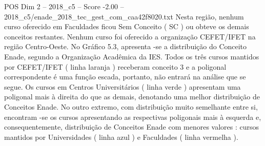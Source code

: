 \begin{textsample}{POS Dim 2 – 2018\_c5 – Score -2.00 – 2018\_c5/enade\_2018\_tec\_gest\_com\_caa42f8020.txt}
Nesta região, nenhum curso oferecido em Faculdades ficou Sem Conceito ( SC ) ou obteve os demais conceitos restantes.
Nenhum curso foi oferecido a organização CEFET/IFET na região Centro-Oeste.
No Gráfico 5.3, apresenta -se a distribuição do Conceito Enade, segundo a Organização Acadêmica da IES.
Todos os três cursos mantidos por CEFET/IFET ( linha laranja ) receberam conceito 3 e a poligonal correspondente é uma função escada, portanto, não entrará na análise que se segue.
Os cursos em Centros Universitários ( linha verde ) apresentam uma poligonal mais à direita do que as demais, denotando uma melhor distribuição de Conceitos Enade.
No outro extremo, com distribuição muito semelhante entre si, encontram -se os cursos apresentando as respectivas poligonais mais à esquerda e, consequentemente, distribuição de Conceitos Enade com menores valores : cursos mantidos por Universidades ( linha azul ) e Faculdades ( linha vermelha ).

\end{textsample}
